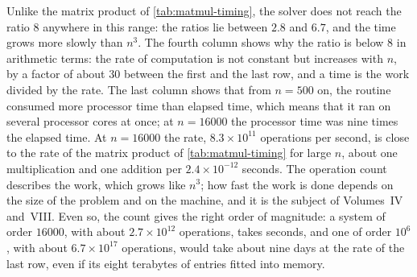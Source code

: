 \begin{table}
\end{table}

Unlike the matrix product of \cref{tab:matmul-timing}, the solver does not reach the ratio $8$ anywhere in this range: the ratios lie between $2.8$ and $6.7$, and the time grows more slowly than $n^3$. The fourth column shows why the ratio is below $8$ in arithmetic terms: the rate of computation is not constant but increases with $n$, by a factor of about $30$ between the first and the last row, and a time is the work divided by the rate. The last column shows that from $n=500$ on, the routine consumed more processor time than elapsed time, which means that it ran on several processor cores at once; at $n=16000$ the processor time was nine times the elapsed time. At $n=16000$ the rate, $8.3\times10^{11}$ operations per second, is close to the rate of the matrix product of \cref{tab:matmul-timing} for large $n$, about one multiplication and one addition per $2.4\times10^{-12}$ seconds. The operation count describes the work, which grows like $n^3$; how fast the work is done depends on the size of the problem and on the machine, and it is the subject of Volumes~IV and~VIII. Even so, the count gives the right order of magnitude: a system of order $16000$, with about $2.7\times10^{12}$ operations, takes seconds, and one of order $10^6$, with about $6.7\times10^{17}$ operations, would take about nine days at the rate of the last row, even if its eight terabytes of entries fitted into memory.

